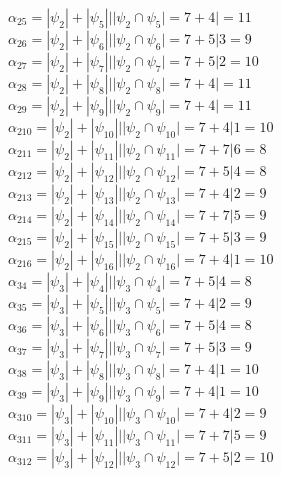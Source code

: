 \documentclass[12pt,a4paper]{report}
\begin{document}
$\alpha_{25} = |\psi_{2}| + |\psi_{5}| | |\psi_{2} \cap \psi_{5}| = 7 + 4 |   = 11$ \\
$\alpha_{26} = |\psi_{2}| + |\psi_{6}| | |\psi_{2} \cap \psi_{6}| = 7 + 5 | 3 = 9$ \\
$\alpha_{27} = |\psi_{2}| + |\psi_{7}| | |\psi_{2} \cap \psi_{7}| = 7 + 5 | 2 = 10$ \\
$\alpha_{28} = |\psi_{2}| + |\psi_{8}| | |\psi_{2} \cap \psi_{8}| = 7 + 4 |   = 11$ \\
$\alpha_{29} = |\psi_{2}| + |\psi_{9}| | |\psi_{2} \cap \psi_{9}| = 7 + 4 |   = 11$ \\
$\alpha_{210} = |\psi_{2}| + |\psi_{10}| | |\psi_{2} \cap \psi_{10}| = 7 + 4 | 1 = 10$ \\
$\alpha_{211} = |\psi_{2}| + |\psi_{11}| | |\psi_{2} \cap \psi_{11}| = 7 + 7 | 6 = 8$ \\
$\alpha_{212} = |\psi_{2}| + |\psi_{12}| | |\psi_{2} \cap \psi_{12}| = 7 + 5 | 4 = 8$ \\
$\alpha_{213} = |\psi_{2}| + |\psi_{13}| | |\psi_{2} \cap \psi_{13}| = 7 + 4 | 2 = 9$ \\
$\alpha_{214} = |\psi_{2}| + |\psi_{14}| | |\psi_{2} \cap \psi_{14}| = 7 + 7 | 5 = 9$ \\
$\alpha_{215} = |\psi_{2}| + |\psi_{15}| | |\psi_{2} \cap \psi_{15}| = 7 + 5 | 3 = 9$ \\
$\alpha_{216} = |\psi_{2}| + |\psi_{16}| | |\psi_{2} \cap \psi_{16}| = 7 + 4 | 1 = 10$ \\
$\alpha_{34} = |\psi_{3}| + |\psi_{4}| | |\psi_{3} \cap \psi_{4}| = 7 + 5 | 4 = 8$ \\
$\alpha_{35} = |\psi_{3}| + |\psi_{5}| | |\psi_{3} \cap \psi_{5}| = 7 + 4 | 2 = 9$ \\
$\alpha_{36} = |\psi_{3}| + |\psi_{6}| | |\psi_{3} \cap \psi_{6}| = 7 + 5 | 4 = 8$ \\
$\alpha_{37} = |\psi_{3}| + |\psi_{7}| | |\psi_{3} \cap \psi_{7}| = 7 + 5 | 3 = 9$ \\
$\alpha_{38} = |\psi_{3}| + |\psi_{8}| | |\psi_{3} \cap \psi_{8}| = 7 + 4 | 1 = 10$ \\
$\alpha_{39} = |\psi_{3}| + |\psi_{9}| | |\psi_{3} \cap \psi_{9}| = 7 + 4 | 1 = 10$ \\
$\alpha_{310} = |\psi_{3}| + |\psi_{10}| | |\psi_{3} \cap \psi_{10}| = 7 + 4 | 2 = 9$ \\
$\alpha_{311} = |\psi_{3}| + |\psi_{11}| | |\psi_{3} \cap \psi_{11}| = 7 + 7 | 5 = 9$ \\
$\alpha_{312} = |\psi_{3}| + |\psi_{12}| | |\psi_{3} \cap \psi_{12}| = 7 + 5 | 2 = 10$ \\
\end{document}
